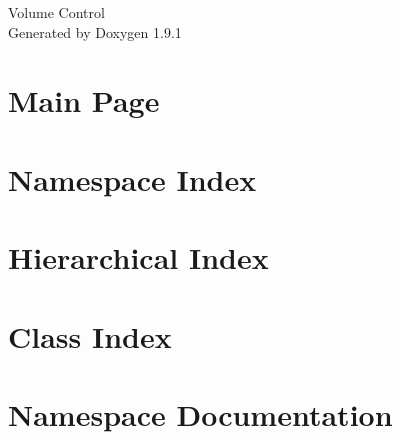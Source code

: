 \let\mypdfximage\pdfximage\def\pdfximage{\immediate\mypdfximage}\documentclass[twoside]{book}
\newcommand{\+}{\discretionary{\mbox{\scriptsize$\hookleftarrow$}}{}{}}
\newcommand{\clearemptydoublepage}{%
  \newpage{\pagestyle{empty}\cleardoublepage}%
}
\begin{document}
\raggedbottom

\hypersetup{pageanchor=false,
             bookmarksnumbered=true,
             pdfencoding=unicode
            }
\begin{titlepage}
\vspace*{7cm}
\begin{center}%
{\Large Volume Control }\\
\vspace*{1cm}
{\large Generated by Doxygen 1.9.1}\\
\end{center}
\end{titlepage}
\clearemptydoublepage
{}
\tableofcontents
\clearemptydoublepage
{}
\hypersetup{pageanchor=true}

\chapter{Main Page}
\label{index}\hypertarget{index}{}
\chapter{Namespace Index}

\chapter{Hierarchical Index}

\chapter{Class Index}

\chapter{Namespace Documentation}


























\end{document}
